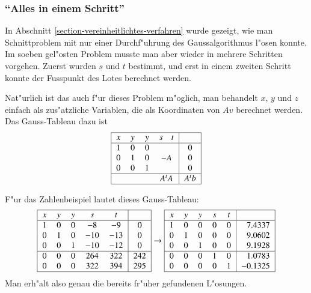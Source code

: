 \subsubsection{``Alles in einem Schritt''}
In Abschnitt \ref{section-vereinheitlichtes-verfahren} wurde gezeigt,
wie man Schnittproblem mit nur einer Durchf"uhrung des Gaussalgorithmus
l"osen konnte. Im soeben gel"osten Problem musste man aber wieder
in mehrere Schritten vorgehen. Zuerst wurden $s$ und $t$ bestimmt,
und erst in einem zweiten Schritt konnte der Fusspunkt des Lotes
berechnet werden.

Nat"urlich ist das auch f"ur dieses Problem m"oglich, man behandelt
$x$, $y$ und $z$ einfach als zus"atzliche Variablen, die als Koordinaten
von $Av$ berechnet werden. Das Gauss-Tableau dazu ist
\[
\begin{tabular}{|>{$}c<{$}>{$}c<{$}>{$}c<{$}>{$}c<{$}|>{$}c<{$}|}
\hline
x&y&y&s\quad t&\\
\hline
1&0&0&        &0\\
0&1&0&-A   &0\\
0&0&1&        &0\\
\hline
 & & &A^tA    &A^tb\\
\hline
\end{tabular}
\]
\begin{beispiel}
F"ur das Zahlenbeispiel lautet dieses Gauss-Tableau:
\[
\begin{tabular}{|>{$}c<{$}>{$}c<{$}>{$}c<{$}>{$}c<{$}>{$}c<{$}|>{$}c<{$}|}
\hline
x&y&y&s  &  t&\\
\hline
1&0&0& -8& -9&0\\
0&1&0&-10&-13&0\\
0&0&1&-10&-12&0\\
\hline
0&0&0&264&322&242\\
0&0&0&322&394&295\\
\hline
\end{tabular}
\rightarrow
\begin{tabular}{|>{$}c<{$}>{$}c<{$}>{$}c<{$}>{$}c<{$}>{$}c<{$}|>{$}r<{$}|}
\hline
x&y&y&s  &  t&\\
\hline
1&0&0&0&0&7.4337\\
0&1&0&0&0&9.0602\\
0&0&1&0&0&9.1928\\
\hline
0&0&0&1&0&1.0783\\
0&0&0&0&1&-0.1325\\
\hline
\end{tabular}
\]
Man erh"alt also genau die bereits fr"uher gefundenen L"osungen.
\end{beispiel}

